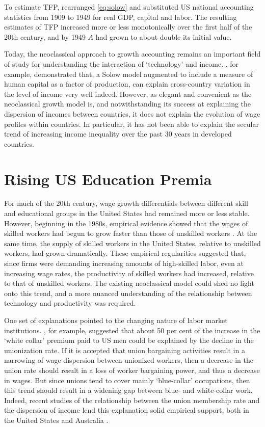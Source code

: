To estimate TFP, \citet{Solow1957} rearranged \eqref{eq:solow} and substituted US national accounting statistics from 1909 to 1949 for real GDP, capital and labor. The resulting estimates of TFP increased more or less monotonically over the first half of the 20th century, and by 1949 $A$ had grown to about double its initial value.

Today, the neoclassical approach to growth accounting remains an important field of study for understanding the interaction of `technology' and income.  \citet{Mankiw1992}, for example, demonstrated that, a Solow model augmented to include a measure of human capital as a factor of production, can explain cross-country variation in the level of income very well indeed. However, as elegant and convenient as the neoclassical growth model is, and notwithstanding its success at explaining the dispersion of incomes between countries, it does not explain the evolution of wage profiles within countries. In particular, it has not been able to explain the secular trend of increasing income inequality over the past 30 years in developed countries. 

\section{Rising US Education Premia}\label{sec:risingpremia}

For much of the 20th century, wage growth differentials between different skill and educational groups in the United States had remained more or less stable. However, beginning in the 1980s, empirical evidence showed that the wages of skilled workers had begun to grow faster than those of unskilled workers \citep{Juhn1993}. At the same time, the supply of skilled workers in the United States, relative to unskilled workers, had grown dramatically. These empirical regularities suggested that, since firms were demanding increasing amounts of high-skilled labor, even at increasing wage rates, the productivity of skilled workers had increased, relative to that of unskilled workers. The existing neoclassical model could shed no light onto this trend, and a more nuanced understanding of the relationship between technology and productivity was required.

One set of explanations pointed to the changing nature of labor market institutions. \citet{Freeman1994}, for example, suggested that about 50 per cent of the increase in the `white collar' premium paid to US men could be explained by the decline in the unionization rate. If it is accepted that union bargaining activities result in a narrowing of wage dispersion between unionized workers, then a decrease in the union rate should result in a loss of worker bargaining power, and thus a decrease in wages. But since unions tend to cover mainly `blue-collar' occupations, then this trend should result in a widening gap between blue- and white-collar work. Indeed, recent studies of the relationship between the union membership rate and the dispersion of income lend this explanation solid empirical support, both in the United States \citep{Card2004,DiNardo1996} and Australia \citep{Borland1996}.

